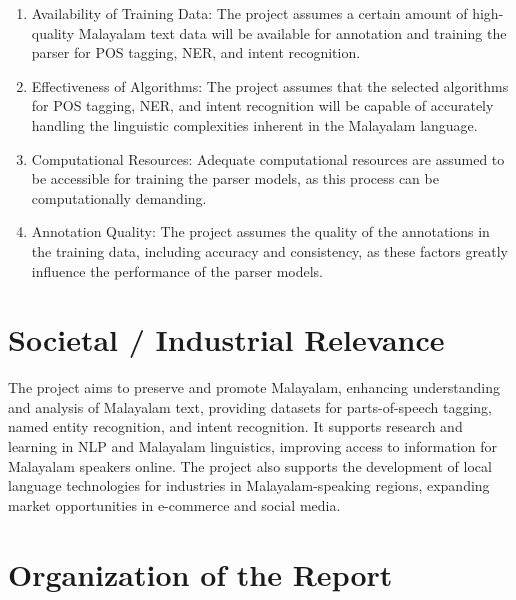 \documentclass[12pt,a4paper,titlepage]{report}
\begin{document}
	\begin{enumerate}
		\item Availability of Training Data: The project assumes a certain amount of high-quality Malayalam text data will be available for annotation and training the parser for POS tagging, NER, and intent recognition.
		\item Effectiveness of Algorithms: The project assumes that the selected algorithms for POS tagging, NER, and intent recognition will be capable of accurately handling the linguistic complexities inherent in the Malayalam language.
		\item Computational Resources: Adequate computational resources are assumed to be accessible for training the parser models, as this process can be computationally demanding.
		\item Annotation Quality: The project assumes the quality of the annotations in the training data, including accuracy and consistency, as these factors greatly influence the performance of the parser models.
		
	\end{enumerate}
	
	
	\section{Societal / Industrial Relevance}
	
	The project aims to preserve and promote Malayalam, enhancing understanding and analysis of Malayalam text, providing datasets for parts-of-speech tagging, named entity recognition, and intent recognition. It supports research and learning in NLP and Malayalam linguistics, improving access to information for Malayalam speakers online. The project also supports the development of local language technologies for industries in Malayalam-speaking regions, expanding market opportunities in e-commerce and social media.
	
	
	\section{Organization of the Report}
	
\end{document}
